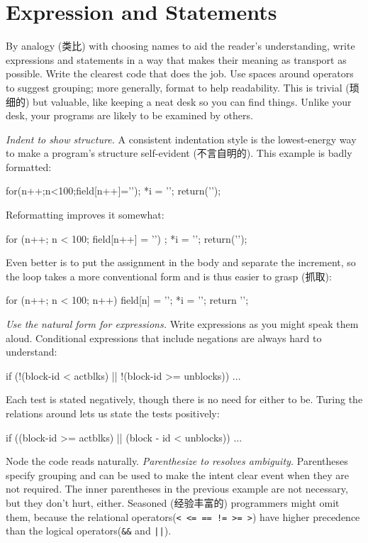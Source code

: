 \section{Expression and Statements}
\label{sec:exprstat}
By analogy (类比) with choosing names to aid the reader's understanding,
write expressions and statements in a way that makes their meaning as
transport as possible. Write the clearest code that does the job. Use
spaces around operators to suggest grouping; more generally, format to help
readability. This is trivial (琐细的) but valuable, like keeping a neat desk
so you can find things. Unlike your desk, your programs are likely to be
examined by others.

\emph{Indent to show structure.} A consistent indentation style is the
lowest-energy way to make a program's structure self-evident (不言自明的).
This example is badly formatted:
\begin{badcode}
    for(n++;n<100;field[n++]='\0');
    *i = '\0'; return('\n');
\end{badcode}
Reformatting improves it somewhat:
\begin{badcode}
    for (n++; n < 100; field[n++] = '\0')
        ;
    *i = '\0';
    return('\n');
\end{badcode}
Even better is to put the assignment in the body and separate the
increment, so the loop takes a more conventional form and is thus easier to
grasp (抓取):
\begin{wellcode}
    for (n++; n < 100; n++)
        field[n] = '\0';
    *i = '\0';
    return '\n';
\end{wellcode}
\emph{Use the natural form for expressions.} Write expressions as you might
speak them aloud. Conditional expressions that include negations are always
hard to understand:
\begin{badcode}
    if (!(block-id < actblks) || !(block-id >= unblocks))
        ...
\end{badcode}
Each test is stated negatively, though there is no need for either to be.
Turing the relations around lets us state the tests positively:
\begin{wellcode}
    if ((block-id >= actblks) || (block - id < unblocks))
        ...
\end{wellcode}
Node the code reads naturally.
\emph{Parenthesize to resolves ambiguity.} Parentheses specify grouping and
can be used to make the intent clear event when they are not required. The
inner parentheses in the previous example are not necessary, but they don't
hurt, either. Seasoned (经验丰富的) programmers might omit them, because the
relational operators(\verb"< <= == != >= >") have higher precedence than
the logical operators(\verb"&&" and \verb"||").

